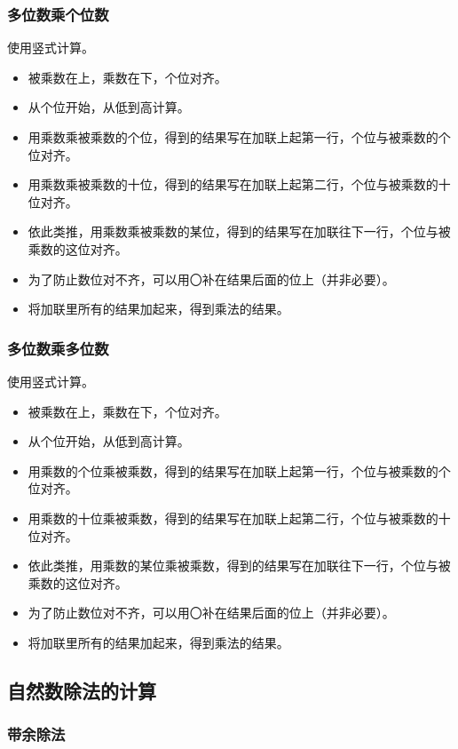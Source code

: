 \documentclass[12pt,UTF8]{ctexbook}
\begin{document}
\subsubsection{多位数乘个位数}

使用竖式计算。

\begin{itemize}
\item 被乘数在上，乘数在下，个位对齐。
\item 从个位开始，从低到高计算。
\item 用乘数乘被乘数的个位，得到的结果写在加联上起第一行，个位与被乘数的个位对齐。
\item 用乘数乘被乘数的十位，得到的结果写在加联上起第二行，个位与被乘数的十位对齐。
\item 依此类推，用乘数乘被乘数的某位，得到的结果写在加联往下一行，个位与被乘数的这位对齐。
\item 为了防止数位对不齐，可以用〇补在结果后面的位上（并非必要）。
\item 将加联里所有的结果加起来，得到乘法的结果。
\end{itemize}

\subsubsection{多位数乘多位数}

使用竖式计算。

\begin{itemize}
\item 被乘数在上，乘数在下，个位对齐。
\item 从个位开始，从低到高计算。
\item 用乘数的个位乘被乘数，得到的结果写在加联上起第一行，个位与被乘数的个位对齐。
\item 用乘数的十位乘被乘数，得到的结果写在加联上起第二行，个位与被乘数的十位对齐。
\item 依此类推，用乘数的某位乘被乘数，得到的结果写在加联往下一行，个位与被乘数的这位对齐。
\item 为了防止数位对不齐，可以用〇补在结果后面的位上（并非必要）。
\item 将加联里所有的结果加起来，得到乘法的结果。
\end{itemize}

\subsection{自然数除法的计算}

\subsubsection{带余除法}
\end{document}
